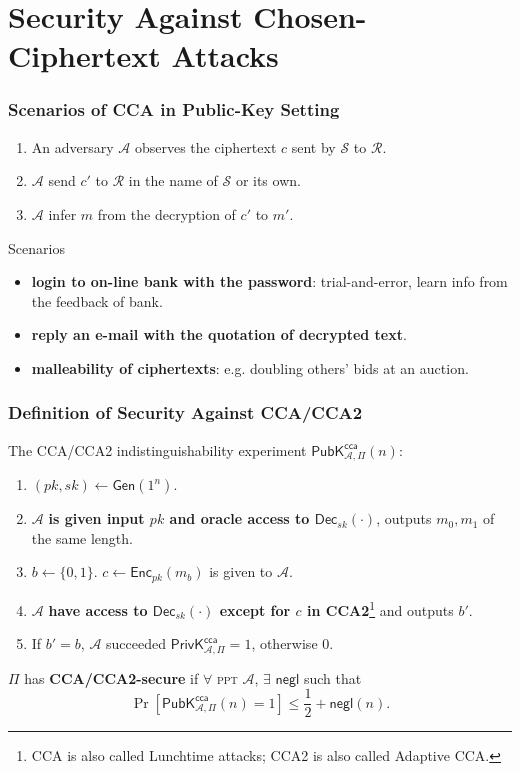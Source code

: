 \section{Security Against Chosen-Ciphertext Attacks}
\begin{frame}\frametitle{Scenarios of CCA in Public-Key Setting}
\begin{enumerate}
\item An adversary $\mathcal{A}$ observes the ciphertext $c$ sent by $\mathcal{S}$ to $\mathcal{R}$.
\item $\mathcal{A}$ send $c'$ to $\mathcal{R}$ in the name of $\mathcal{S}$ or its own.
\item $\mathcal{A}$ infer $m$ from the decryption of $c'$ to $m'$.
\end{enumerate}
\begin{exampleblock}{Scenarios}
\begin{itemize}
\item \textbf{login to on-line bank with the password}: trial-and-error, learn info from the feedback of bank.
\item \textbf{reply an e-mail with the quotation of decrypted text}.
\item \textbf{malleability of ciphertexts}: e.g. doubling others' bids at an auction.
\end{itemize}
\end{exampleblock}
\end{frame}
\begin{frame}\frametitle{Definition of Security Against CCA/CCA2}
The CCA/CCA2 indistinguishability experiment $\mathsf{PubK}^{\mathsf{cca}}_{\mathcal{A},\Pi}(n)$:
\begin{enumerate}
\item $(pk,sk) \gets \mathsf{Gen}(1^n)$.
\item $\mathcal{A}$ \textbf{is given input $pk$ and oracle access to $\mathsf{Dec}_{sk}(\cdot)$}, outputs $m_0, m_1$ of the same length. 
\item $b \gets \{0,1\}$. $c \gets \mathsf{Enc}_{pk}(m_b)$ is given to $\mathcal{A}$.
\item $\mathcal{A}$ \textbf{have access to $\mathsf{Dec}_{sk}(\cdot)$ except for $c$ in CCA2}\footnote{CCA is also called Lunchtime attacks; CCA2 is also called Adaptive CCA.} and outputs $b'$.
\item If $b' = b$, $\mathcal{A}$ succeeded $\mathsf{PrivK}^{\mathsf{cca}}_{\mathcal{A},\Pi}=1$, otherwise 0.
\end{enumerate}
\begin{definition}
$\Pi$ has \textbf{CCA/CCA2-secure} if $\forall$ \textsc{ppt} $\mathcal{A}$, $\exists$ $\mathsf{negl}$ such that
\[ \Pr\left[\mathsf{PubK}^{\mathsf{cca}}_{\mathcal{A},\Pi}(n)=1\right] \le \frac{1}{2} + \mathsf{negl}(n). \]
\end{definition}
\end{frame}
